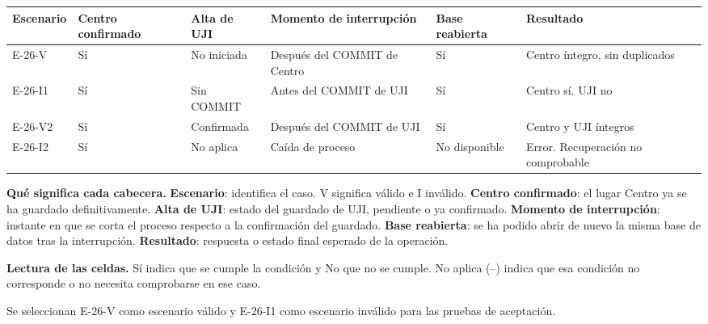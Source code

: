 \begingroup\fontsize{7.8}{11}\selectfont\setlength{\tabcolsep}{3pt}
\begin{tabularx}{\linewidth}{@{}*{6}{Y}@{}}\toprule
\textbf{Escenario} & \textbf{Centro confirmado} & \textbf{Alta de UJI} & \textbf{Momento de interrupción} & \textbf{Base reabierta} & \textbf{Resultado}\\\midrule
E-26-V & Sí & No iniciada & Después del COMMIT de Centro & Sí & Centro íntegro, sin duplicados\\[3pt]
E-26-I1 & Sí & Sin COMMIT & Antes del COMMIT de UJI & Sí & Centro sí. UJI no\\[3pt]
E-26-V2 & Sí & Confirmada & Después del COMMIT de UJI & Sí & Centro y UJI íntegros\\[3pt]
E-26-I2 & Sí & No aplica & Caída de proceso & No disponible & Error. Recuperación no comprobable\\[3pt]
\bottomrule\end{tabularx}\endgroup\par
{\fontsize{9}{11}\selectfont\textbf{Qué significa cada cabecera.} \textbf{Escenario}: identifica el caso. V significa válido e I inválido. \textbf{Centro confirmado}: el lugar Centro ya se ha guardado definitivamente. \textbf{Alta de UJI}: estado del guardado de UJI, pendiente o ya confirmado. \textbf{Momento de interrupción}: instante en que se corta el proceso respecto a la confirmación del guardado. \textbf{Base reabierta}: se ha podido abrir de nuevo la misma base de datos tras la interrupción. \textbf{Resultado}: respuesta o estado final esperado de la operación.\par\textbf{Lectura de las celdas.} Sí indica que se cumple la condición y No que no se cumple. No aplica (--) indica que esa condición no corresponde o no necesita comprobarse en ese caso.\par}


Se seleccionan E-26-V como escenario válido y E-26-I1 como escenario inválido para las pruebas de aceptación.\par


